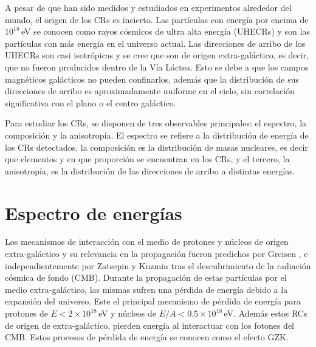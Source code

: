 A pesar de que han sido medidos y estudiados en experimentos alrededor del mundo, el origen de los CRs es incierto. Las partículas con energía por encima de $10^{18}\,$eV se conocen como rayos cósmicos de ultra alta energía (UHECRs) y son las partículas con más energía en el universo actual. Las direcciones de arribo de los UHECRs son casi isotrópicas  \cite{collaboration2013pierre} \cite{data} y se cree que son de origen extra-galáctico, es decir, que no fueron producidos dentro de la Vía Láctea. Esto se debe a que los campos magnéticos galácticos no pueden confinarlos, además que la distribución de sus direcciones de arribo es aproximadamente uniforme en el cielo, sin correlación significativa con el plano o el centro galáctico. 

Para estudiar los CRs, se disponen de tres observables principales: el espectro, la composición y la anisotropía. El espectro se refiere a la distribución de energía de los CRs detectados, la composición es la distribución de masas nucleares, es decir que elementos y en que proporción se encuentran en los CRs, y el tercero, la anisotropía, es la distribución de las direcciones de arribo a distintas energías.

\section{Espectro de energías}
Los mecanismos de interacción con el medio de protones y núcleos de origen extra-galáctico y su relevancia en la propagación fueron predichos por Greisen \cite{greisen1966end}, e independientemente por Zatsepin y Kuzmin \cite{zatsepin1966upper} tras el descubrimiento de la radiación cósmica de fondo (CMB). Durante la propagación  de estas  partículas por el medio extra-galáctico, las mismas sufren una pérdida de energía debido a la expansión del universo. Este el principal mecanismo de pérdida de energía para protones de $E < 2\times 10^{18}\,$eV y núcleos de $E/A < 0.5\times 10^{18}\,$eV. Además estos RCs de origen de extra-galáctico, pierden energía al interactuar con los fotones del  CMB.  Estos procesos de pérdida de energía se conocen como el efecto GZK.

